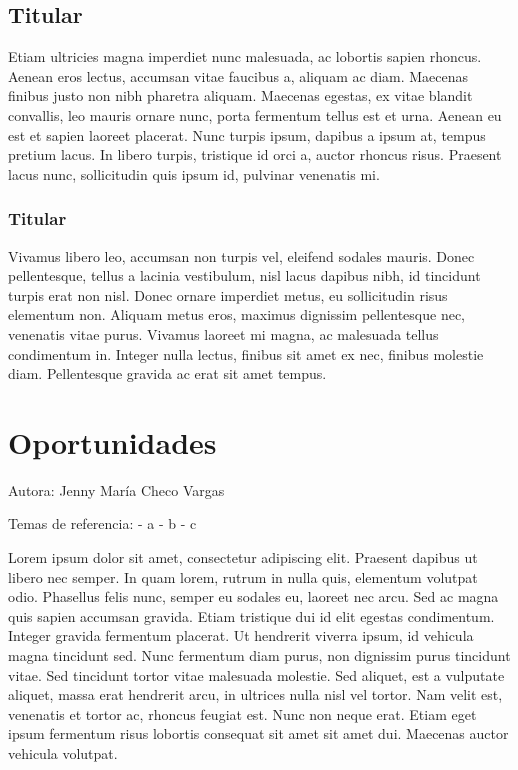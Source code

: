 \documentclass[
  letterpaper,
  DIV=11,
  numbers=noendperiod]{scrreprt}
\begin{document}
\hypertarget{titular-4}{%
\section{Titular}\label{titular-4}}

Etiam ultricies magna imperdiet nunc malesuada, ac lobortis sapien
rhoncus. Aenean eros lectus, accumsan vitae faucibus a, aliquam ac diam.
Maecenas finibus justo non nibh pharetra aliquam. Maecenas egestas, ex
vitae blandit convallis, leo mauris ornare nunc, porta fermentum tellus
est et urna. Aenean eu est et sapien laoreet placerat. Nunc turpis
ipsum, dapibus a ipsum at, tempus pretium lacus. In libero turpis,
tristique id orci a, auctor rhoncus risus. Praesent lacus nunc,
sollicitudin quis ipsum id, pulvinar venenatis mi.

\hypertarget{titular-5}{%
\subsection{Titular}\label{titular-5}}

Vivamus libero leo, accumsan non turpis vel, eleifend sodales mauris.
Donec pellentesque, tellus a lacinia vestibulum, nisl lacus dapibus
nibh, id tincidunt turpis erat non nisl. Donec ornare imperdiet metus,
eu sollicitudin risus elementum non. Aliquam metus eros, maximus
dignissim pellentesque nec, venenatis vitae purus. Vivamus laoreet mi
magna, ac malesuada tellus condimentum in. Integer nulla lectus, finibus
sit amet ex nec, finibus molestie diam. Pellentesque gravida ac erat sit
amet tempus.


\hypertarget{oportunidades}{%
\chapter{Oportunidades}\label{oportunidades}}

Autora: Jenny María Checo Vargas

Temas de referencia: - a - b - c

Lorem ipsum dolor sit amet, consectetur adipiscing elit. Praesent
dapibus ut libero nec semper. In quam lorem, rutrum in nulla quis,
elementum volutpat odio. Phasellus felis nunc, semper eu sodales eu,
laoreet nec arcu. Sed ac magna quis sapien accumsan gravida. Etiam
tristique dui id elit egestas condimentum. Integer gravida fermentum
placerat. Ut hendrerit viverra ipsum, id vehicula magna tincidunt sed.
Nunc fermentum diam purus, non dignissim purus tincidunt vitae. Sed
tincidunt tortor vitae malesuada molestie. Sed aliquet, est a vulputate
aliquet, massa erat hendrerit arcu, in ultrices nulla nisl vel tortor.
Nam velit est, venenatis et tortor ac, rhoncus feugiat est. Nunc non
neque erat. Etiam eget ipsum fermentum risus lobortis consequat sit amet
sit amet dui. Maecenas auctor vehicula volutpat.
\end{document}
